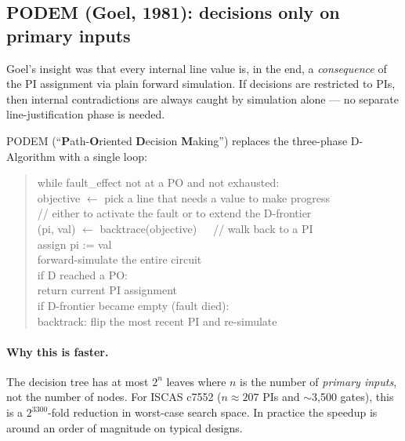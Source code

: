 \documentclass[11pt,a4paper]{article}
\begin{document}
\subsection{PODEM (Goel, 1981): decisions only on primary inputs}

Goel's insight was that every internal line value is, in the end, a
\emph{consequence} of the PI assignment via plain forward simulation.
If decisions are restricted to PIs, then internal contradictions are
always caught by simulation alone --- no separate line-justification
phase is needed.

PODEM (``\textbf{P}ath-\textbf{O}riented \textbf{D}ecision
\textbf{M}aking'') replaces the three-phase D-Algorithm with a single
loop:
\begin{quote}\small
\ttfamily
while fault\_effect not at a PO and not exhausted:\\
\hspace*{2em}objective $\leftarrow$ pick a line that needs a value to make progress\\
\hspace*{2em}\hspace*{2em}// either to activate the fault or to extend the D-frontier\\
\hspace*{2em}(pi, val) $\leftarrow$ backtrace(objective)~~~// walk back to a PI\\
\hspace*{2em}assign pi := val\\
\hspace*{2em}forward-simulate the entire circuit\\
\hspace*{2em}if D reached a PO:\\
\hspace*{2em}\hspace*{2em}return current PI assignment\\
\hspace*{2em}if D-frontier became empty (fault died):\\
\hspace*{2em}\hspace*{2em}backtrack: flip the most recent PI and re-simulate
\end{quote}

\paragraph{Why this is faster.} The decision tree has at most $2^{n}$
leaves where $n$ is the number of \emph{primary inputs}, not the
number of nodes. For ISCAS c7552 ($n \approx 207$ PIs and $\sim$3{,}500
gates), this is a $2^{3300}$-fold reduction in worst-case search
space. In practice the speedup is around an order of magnitude on
typical designs.
\end{document}
